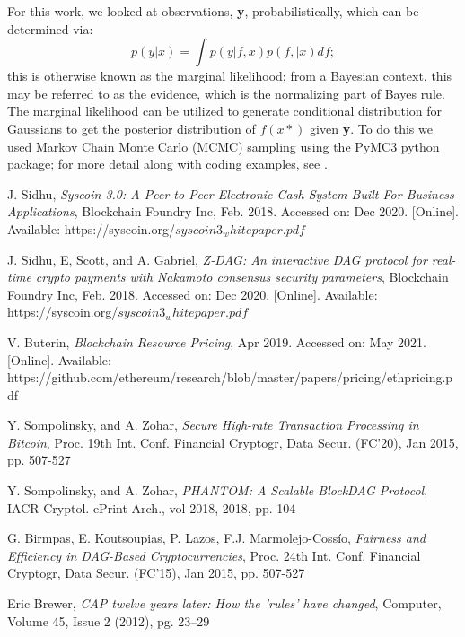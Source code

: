 \documentclass[peerreview]{ieeesyscoin}
\begin{document}
For this work, we looked at observations, \textbf{y}, probabilistically, which can be determined via:
\begin{equation}
p(y|x) = \int p(y | f,x) p (f, |x) df;
\end{equation}
this is otherwise known as the marginal likelihood; from a Bayesian context, this may be referred to as the evidence, which is the normalizing part of Bayes rule. The marginal likelihood can be utilized to generate conditional distribution for Gaussians to get the posterior distribution of $f(x*)$ given \textbf{y}. To do this we used Markov Chain Monte Carlo (MCMC) sampling using the PyMC3 python package; for more detail along with coding examples, see \cite{Fon20}.

\begin{thebibliography}{00}


 J. Sidhu, \textit{Syscoin 3.0: A Peer-to-Peer Electronic Cash System Built For Business Applications}, Blockchain Foundry Inc, Feb. 2018. Accessed on: Dec 2020. [Online]. Available: https://syscoin.org/$syscoin3_whitepaper.pdf$

 J. Sidhu, E, Scott, and A. Gabriel, \textit{Z-DAG: An interactive DAG protocol for real-time crypto payments with Nakamoto consensus security parameters}, Blockchain Foundry Inc, Feb. 2018. Accessed on: Dec 2020. [Online]. Available: https://syscoin.org/$syscoin3_whitepaper.pdf$

 V. Buterin,  \textit{Blockchain Resource Pricing}, Apr 2019. Accessed on: May 2021. [Online]. Available: https://github.com/ethereum/research/blob/master/papers/pricing/ethpricing.pdf

 Y. Sompolinsky, and A. Zohar, \textit{Secure High-rate Transaction Processing in Bitcoin}, Proc. 19th Int. Conf. Financial Cryptogr, Data Secur. (FC’20), Jan 2015, pp. 507-527

 Y. Sompolinsky, and A. Zohar, \textit{PHANTOM: A Scalable BlockDAG Protocol}, IACR Cryptol. ePrint Arch., vol 2018, 2018,  pp. 104

 G. Birmpas, E. Koutsoupias, P. Lazos, F.J. Marmolejo-Cossío, \textit{Fairness and Efficiency in DAG-Based Cryptocurrencies}, Proc. 24th Int. Conf. Financial Cryptogr, Data Secur. (FC’15), Jan 2015, pp. 507-527

 Eric Brewer, \textit{CAP twelve years later: How the 'rules' have changed}, Computer, Volume 45, Issue 2 (2012), pg. 23–29


\end{thebibliography}
\end{document}
